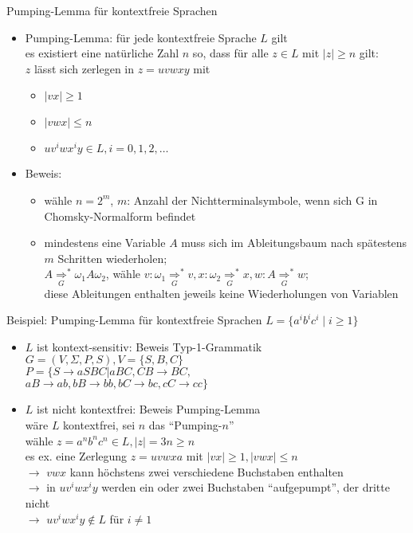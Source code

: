 \begin{frame}{Pumping-Lemma für kontextfreie Sprachen}
	\begin{itemize}
		\item Pumping-Lemma: für jede kontextfreie Sprache $L$ gilt\\
		es existiert eine natürliche Zahl $n$ so, dass für alle $z \in L$ mit $|z|\geq n$ gilt:\\
		$z$ lässt sich zerlegen in $z=uvwxy$ mit
		\begin{itemize}
			\item $|vx|\geq 1$
			\item $|vwx| \leq n$
			\item $uv^iwx^iy \in L, i=0, 1, 2, \ldots$
		\end{itemize}
		\item Beweis:
		\begin{itemize}
			\item wähle $n=2^m$, $m$: Anzahl der Nichtterminalsymbole, wenn sich G in Chomsky-Normalform befindet
			\item mindestens eine Variable $A$ muss sich im Ableitungsbaum nach spätestens $m$ Schritten wiederholen;\\
			$A\underset{G}{\Rightarrow}^*\omega_1 A \omega_2$, wähle $v: \omega_1 \underset{G}{\Rightarrow}^* v, x: \omega_2 \underset{G}{\Rightarrow}^* x, w: A \underset{G}{\Rightarrow}^* w$;\\
			diese Ableitungen enthalten jeweils keine Wiederholungen von Variablen
		\end{itemize}
	\end{itemize}
\end{frame}

\begin{frame}{Beispiel: Pumping-Lemma für kontextfreie Sprachen}
	$L=\{a^ib^ic^i \mid i\geq 1 \}$
	\begin{itemize}
		\item $L$ ist kontext-sensitiv: Beweis Typ-1-Grammatik\\
		$G=(V, \Sigma, P, S), V=\{S, B, C\}$\\
		$P=\{S\rightarrow aSBC | aBC, CB \rightarrow BC,$\\
		\qquad $aB \rightarrow ab, bB \rightarrow bb, bC \rightarrow bc, cC \rightarrow cc \}$
		\item $L$ ist nicht kontextfrei: Beweis Pumping-Lemma\\
		wäre $L$ kontextfrei, sei $n$ das "`Pumping-$n$"'\\
		wähle $z=a^nb^nc^n \in L, |z|=3n \geq n$\\
		es ex. eine Zerlegung $z=uvwxa$ mit $|vx|\geq 1, |vwx| \leq n$\\
		$\rightarrow$ $vwx$ kann höchstens zwei verschiedene Buchstaben enthalten\\
		$\rightarrow$ in $uv^iwx^iy$ werden ein oder zwei Buchstaben "`aufgepumpt"', der dritte nicht\\
		$\rightarrow$ $uv^iwx^iy \notin L$ für $i \neq 1$ \lightning 
	\end{itemize}
\end{frame}

